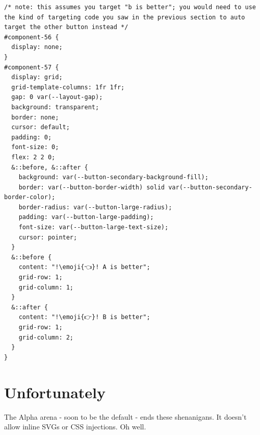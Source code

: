 \documentclass[11pt,a4paper]{article}
\newcommand{\emoji}[1]{
  {\setmainfont{Noto Color Emoji}[Renderer=Harfbuzz]{#1}}
}
\begin{document}
\begin{lstlisting}[caption=Code that fakes the button, escapechar=\!]
/* note: this assumes you target "b is better"; you would need to use the kind of targeting code you saw in the previous section to auto target the other button instead */
#component-56 {
  display: none;
}
#component-57 {
  display: grid;
  grid-template-columns: 1fr 1fr;
  gap: 0 var(--layout-gap);
  background: transparent;
  border: none;
  cursor: default;
  padding: 0;
  font-size: 0;
  flex: 2 2 0;
  &::before, &::after {
    background: var(--button-secondary-background-fill);
    border: var(--button-border-width) solid var(--button-secondary-border-color);
    border-radius: var(--button-large-radius);
    padding: var(--button-large-padding);
    font-size: var(--button-large-text-size);
    cursor: pointer;
  }
  &::before {
    content: "!\emoji{👈}! A is better";
    grid-row: 1;
    grid-column: 1;
  }
  &::after {
    content: "!\emoji{👉}! B is better";
    grid-row: 1;
    grid-column: 2;
  }
}
\end{lstlisting}

\section{Unfortunately}
The Alpha arena - soon to be the default - ends these shenanigans. It doesn't allow inline SVGs or CSS injections. Oh well.
\end{document}
